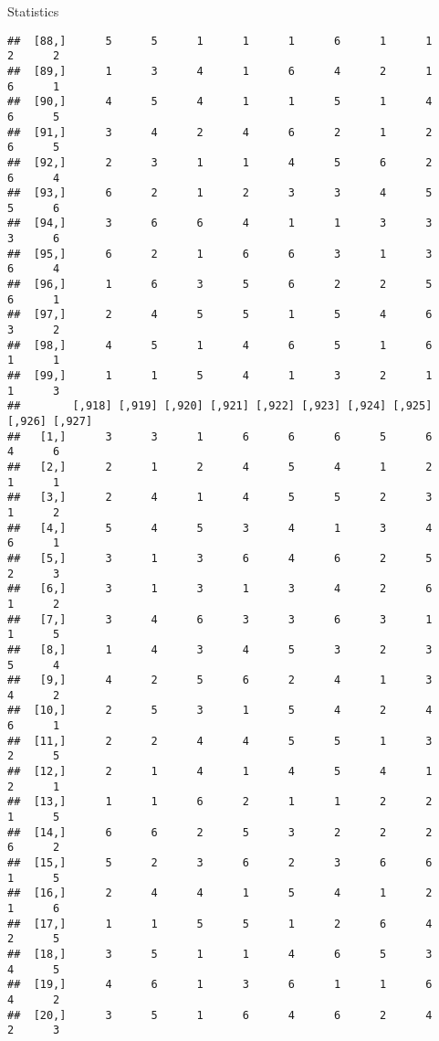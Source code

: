 \documentclass[
  ignorenonframetext,
]{beamer}
\begin{document}
\begin{frame}[fragile]{Statistics}
\begin{verbatim}
##  [88,]      5      5      1      1      1      6      1      1      2      2
##  [89,]      1      3      4      1      6      4      2      1      6      1
##  [90,]      4      5      4      1      1      5      1      4      6      5
##  [91,]      3      4      2      4      6      2      1      2      6      5
##  [92,]      2      3      1      1      4      5      6      2      6      4
##  [93,]      6      2      1      2      3      3      4      5      5      6
##  [94,]      3      6      6      4      1      1      3      3      3      6
##  [95,]      6      2      1      6      6      3      1      3      6      4
##  [96,]      1      6      3      5      6      2      2      5      6      1
##  [97,]      2      4      5      5      1      5      4      6      3      2
##  [98,]      4      5      1      4      6      5      1      6      1      1
##  [99,]      1      1      5      4      1      3      2      1      1      3
##        [,918] [,919] [,920] [,921] [,922] [,923] [,924] [,925] [,926] [,927]
##   [1,]      3      3      1      6      6      6      5      6      4      6
##   [2,]      2      1      2      4      5      4      1      2      1      1
##   [3,]      2      4      1      4      5      5      2      3      1      2
##   [4,]      5      4      5      3      4      1      3      4      6      1
##   [5,]      3      1      3      6      4      6      2      5      2      3
##   [6,]      3      1      3      1      3      4      2      6      1      2
##   [7,]      3      4      6      3      3      6      3      1      1      5
##   [8,]      1      4      3      4      5      3      2      3      5      4
##   [9,]      4      2      5      6      2      4      1      3      4      2
##  [10,]      2      5      3      1      5      4      2      4      6      1
##  [11,]      2      2      4      4      5      5      1      3      2      5
##  [12,]      2      1      4      1      4      5      4      1      2      1
##  [13,]      1      1      6      2      1      1      2      2      1      5
##  [14,]      6      6      2      5      3      2      2      2      6      2
##  [15,]      5      2      3      6      2      3      6      6      1      5
##  [16,]      2      4      4      1      5      4      1      2      1      6
##  [17,]      1      1      5      5      1      2      6      4      2      5
##  [18,]      3      5      1      1      4      6      5      3      4      5
##  [19,]      4      6      1      3      6      1      1      6      4      2
##  [20,]      3      5      1      6      4      6      2      4      2      3

\end{verbatim}
\end{frame}
\end{document}
